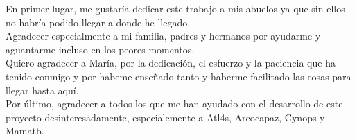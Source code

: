 
\setcounter{page}{3}
	


En primer lugar, me gustaría dedicar este trabajo a mis abuelos ya que sin ellos no habría podido llegar a donde he llegado. \\

Agradecer especialmente a mi familia, padres y hermanos por ayudarme y aguantarme incluso en los peores momentos. \\

Quiero agradecer a María, por la dedicación, el esfuerzo y la paciencia que ha tenido conmigo y por habeme enseñado tanto y haberme facilitado las cosas para llegar hasta aquí. \\

Por último, agradecer a todos los que me han ayudado con el desarrollo de este proyecto desinteresadamente, especialemente a Atl4s, Arcocapaz, Cynops y Mamatb.
\vfill
\newpage %
\thispagestyle{empty}
\mbox{}
